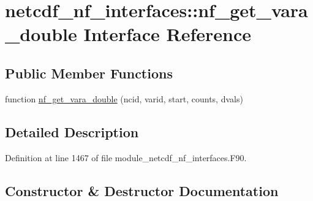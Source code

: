 \hypertarget{interfacenetcdf__nf__interfaces_1_1nf__get__vara__double}{}\section{netcdf\+\_\+nf\+\_\+interfaces\+:\+:nf\+\_\+get\+\_\+vara\+\_\+double Interface Reference}
\label{interfacenetcdf__nf__interfaces_1_1nf__get__vara__double}
\subsection*{Public Member Functions}
\begin{DoxyCompactItemize}
\item 
function \hyperlink{interfacenetcdf__nf__interfaces_1_1nf__get__vara__double_a4b69c283b976eaf709d4d7e6a30f30f8}{nf\+\_\+get\+\_\+vara\+\_\+double} (ncid, varid, start, counts, dvals)
\end{DoxyCompactItemize}


\subsection{Detailed Description}


Definition at line 1467 of file module\+\_\+netcdf\+\_\+nf\+\_\+interfaces.\+F90.



\subsection{Constructor \& Destructor Documentation}
\mbox{\label{interfacenetcdf__nf__interfaces_1_1nf__get__vara__double_a4b69c283b976eaf709d4d7e6a30f30f8}} 
